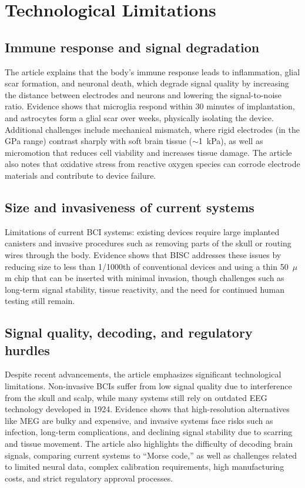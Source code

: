 \documentclass[11pt]{article}
\begin{document}
\section{Technological Limitations}

\subsection*{Immune response and signal degradation \cite{gao2025biocompat}}
The article explains that the body's immune response leads to inflammation,
glial scar formation, and neuronal death, which degrade signal quality by
increasing the distance between electrodes and neurons and lowering the
signal-to-noise ratio. Evidence shows that microglia respond within 30 minutes
of implantation, and astrocytes form a glial scar over weeks, physically
isolating the device. Additional challenges include mechanical mismatch, where
rigid electrodes (in the GPa range) contrast sharply with soft brain tissue
($\sim$1~kPa), as well as micromotion that reduces cell viability and increases
tissue damage. The article also notes that oxidative stress from reactive oxygen
species can corrode electrode materials and contribute to device failure.

\subsection*{Size and invasiveness of current systems \cite{hoos2025columbia}}
Limitations of current BCI systems: existing devices require large implanted
canisters and invasive procedures such as removing parts of the skull or routing
wires through the body. Evidence shows that BISC addresses these issues by
reducing size to less than 1/1000th of conventional devices and using a thin
50~$\mu$m chip that can be inserted with minimal invasion, though challenges such
as long-term signal stability, tissue reactivity, and the need for continued
human testing still remain.

\subsection*{Signal quality, decoding, and regulatory hurdles \cite{kreg2025byfounders}}
Despite recent advancements, the article emphasizes significant technological
limitations. Non-invasive BCIs suffer from low signal quality due to interference
from the skull and scalp, while many systems still rely on outdated EEG
technology developed in 1924. Evidence shows that high-resolution alternatives
like MEG are bulky and expensive, and invasive systems face risks such as
infection, long-term complications, and declining signal stability due to
scarring and tissue movement. The article also highlights the difficulty of
decoding brain signals, comparing current systems to ``Morse code,'' as well as
challenges related to limited neural data, complex calibration requirements,
high manufacturing costs, and strict regulatory approval processes.
\end{document}
